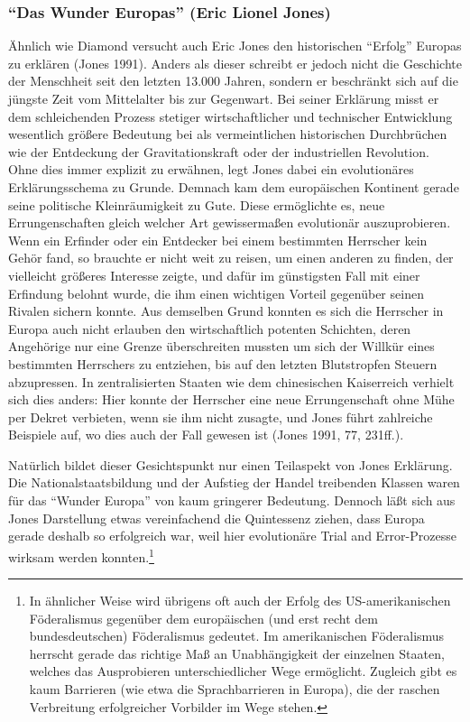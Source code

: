 \documentclass[12pt,a4paper,ngerman]{article}
\begin{document}
\subsubsection{"`Das Wunder Europas"' (Eric Lionel Jones)}

Ähnlich wie Diamond versucht auch Eric Jones den historischen "`Erfolg"'
Europas zu erklären (Jones 1991). Anders als dieser schreibt er jedoch nicht
die Geschichte der Menschheit seit den letzten 13.000 Jahren, sondern er
beschränkt sich auf die jüngste Zeit vom Mittelalter bis zur Gegenwart. Bei
seiner Erklärung misst er dem schleichenden Prozess stetiger wirtschaftlicher
und technischer Entwicklung wesentlich größere Bedeutung bei als
vermeintlichen historischen Durchbrüchen wie der Entdeckung der
Gravitationskraft oder der industriellen Revolution. Ohne dies immer explizit
zu erwähnen, legt Jones dabei ein evolutionäres Erklärungsschema zu Grunde.
Demnach kam dem europäischen Kontinent gerade seine politische Kleinräumigkeit
zu Gute. Diese ermöglichte es, neue Errungenschaften gleich welcher Art
gewissermaßen evolutionär auszuprobieren. Wenn ein Erfinder oder ein Entdecker
bei einem bestimmten Herrscher kein Gehör fand, so brauchte er nicht weit zu
reisen, um einen anderen zu finden, der vielleicht größeres Interesse zeigte,
und dafür im günstigsten Fall mit einer Erfindung belohnt wurde, die ihm
einen wichtigen Vorteil gegenüber seinen Rivalen sichern konnte. Aus demselben
Grund konnten es sich die Herrscher in Europa auch nicht erlauben den
wirtschaftlich potenten Schichten, deren Angehörige nur eine Grenze
überschreiten mussten um sich der Willkür eines bestimmten Herrschers zu
entziehen, bis auf den letzten Blutstropfen Steuern abzupressen. In
zentralisierten Staaten wie dem chinesischen Kaiserreich verhielt sich dies
anders: Hier konnte der Herrscher eine neue Errungenschaft ohne Mühe per
Dekret verbieten, wenn sie ihm nicht zusagte, und Jones führt zahlreiche
Beispiele auf, wo dies auch der Fall gewesen ist (Jones 1991, 77, 231ff.). 

Natürlich bildet dieser Gesichtspunkt nur einen Teilaspekt von Jones
Erklärung. Die Nationalstaatsbildung und der Aufstieg der Handel
treibenden Klassen waren für das "`Wunder Europa"' von kaum gringerer
Bedeutung. Dennoch läßt sich aus Jones Darstellung etwas vereinfachend
die Quintessenz ziehen, dass Europa gerade deshalb so erfolgreich war,
weil hier evolutionäre Trial and Error-Prozesse wirksam werden
konnten.\footnote{In ähnlicher Weise wird übrigens oft auch der Erfolg
  des US-amerikanischen Föderalismus gegenüber dem europäischen (und
  erst recht dem bundesdeutschen) Föderalismus gedeutet. Im
  amerikanischen Föderalismus herrscht gerade das richtige Maß an
  Unabhängigkeit der einzelnen Staaten, welches das Ausprobieren
  unterschiedlicher Wege ermöglicht. Zugleich gibt es kaum Barrieren
  (wie etwa die Sprachbarrieren in Europa), die der raschen
  Verbreitung erfolgreicher Vorbilder im Wege stehen.}
\end{document}
